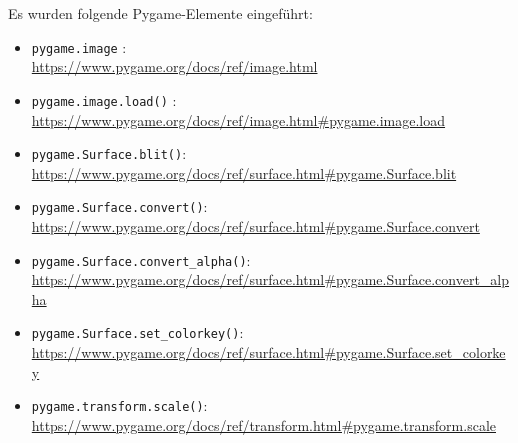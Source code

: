 Es wurden folgende Pygame-Elemente eingeführt:

\begin{itemize}
	\item \texttt{pygame.image}
	:\\
	\url{https://www.pygame.org/docs/ref/image.html}
	
	\item \texttt{pygame.image.load()}
	:\\
	\url{https://www.pygame.org/docs/ref/image.html#pygame.image.load}
	
	\item \texttt{pygame.Surface.blit()}:
	\\
	\url{https://www.pygame.org/docs/ref/surface.html#pygame.Surface.blit}
	
	\item \texttt{pygame.Surface.convert()}:
	\\
	\url{https://www.pygame.org/docs/ref/surface.html#pygame.Surface.convert}
	
	\item \texttt{pygame.Surface.convert\_alpha()}:
	\\
	\url{https://www.pygame.org/docs/ref/surface.html#pygame.Surface.convert\_alpha}
	
	\item \texttt{pygame.Surface.set\_colorkey()}:
	\\
	\url{https://www.pygame.org/docs/ref/surface.html#pygame.Surface.set\_colorkey}
	
	\item \texttt{pygame.transform.scale()}:
	\\
	\url{https://www.pygame.org/docs/ref/transform.html#pygame.transform.scale}
	
\end{itemize}

